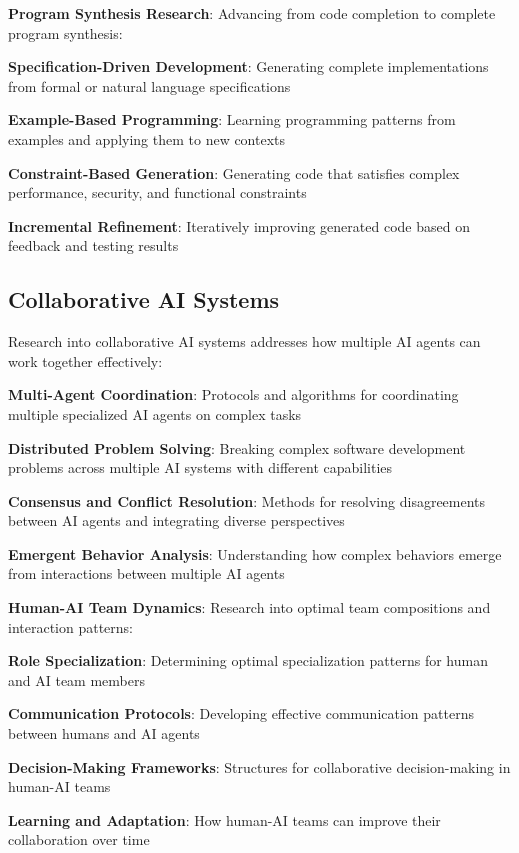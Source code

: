 \textbf{Program Synthesis Research}:
Advancing from code completion to complete program synthesis:

\begin{compactlist}
    \item \textbf{Specification-Driven Development}: Generating complete implementations from formal or natural language specifications
    \item \textbf{Example-Based Programming}: Learning programming patterns from examples and applying them to new contexts
    \item \textbf{Constraint-Based Generation}: Generating code that satisfies complex performance, security, and functional constraints
    \item \textbf{Incremental Refinement}: Iteratively improving generated code based on feedback and testing results
\end{compactlist}

\subsection*{Collaborative AI Systems}

Research into collaborative AI systems addresses how multiple AI agents can work together effectively:

\begin{expandedlist}
    \item \textbf{Multi-Agent Coordination}: Protocols and algorithms for coordinating multiple specialized AI agents on complex tasks
    \item \textbf{Distributed Problem Solving}: Breaking complex software development problems across multiple AI systems with different capabilities
    \item \textbf{Consensus and Conflict Resolution}: Methods for resolving disagreements between AI agents and integrating diverse perspectives
    \item \textbf{Emergent Behavior Analysis}: Understanding how complex behaviors emerge from interactions between multiple AI agents
\end{expandedlist}

\textbf{Human-AI Team Dynamics}:
Research into optimal team compositions and interaction patterns:

\begin{compactlist}
    \item \textbf{Role Specialization}: Determining optimal specialization patterns for human and AI team members
    \item \textbf{Communication Protocols}: Developing effective communication patterns between humans and AI agents
    \item \textbf{Decision-Making Frameworks}: Structures for collaborative decision-making in human-AI teams
    \item \textbf{Learning and Adaptation}: How human-AI teams can improve their collaboration over time
\end{compactlist}

